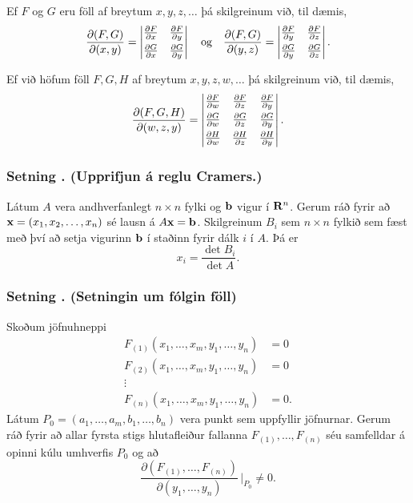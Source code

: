 Ef $F$ og $G$ eru föll af breytum $x,y,z,\ldots$ þá skilgreinum við,
til dæmis,
$$\frac{\partial(F,G)}{\partial(x,y)}=
\begin{vmatrix} 
\frac{\partial F}{\partial x}&\frac{\partial F}{\partial y}\\
\noalign{\smallskip}
\frac{\partial G}{\partial x}&\frac{\partial G}{\partial y}
\end{vmatrix}\quad \mbox{og}\quad
\frac{\partial(F,G)}{\partial(y,z)}=
\begin{vmatrix} 
\frac{\partial F}{\partial y}&\frac{\partial F}{\partial z}\\
\noalign{\smallskip}
\frac{\partial G}{\partial y}&\frac{\partial G}{\partial z}
\end{vmatrix}.$$

Ef við höfum föll $F, G, H$ af breytum $x,y,z,w,\ldots$ þá
skilgreinum við, til dæmis,
$$\frac{\partial(F,G,H)}{\partial(w,z,y)}=
\begin{vmatrix} 
\frac{\partial F}{\partial w}&\frac{\partial F}{\partial z}
&\frac{\partial F}{\partial y}\\
\noalign{\smallskip}
\frac{\partial G}{\partial w}&\frac{\partial G}{\partial z}
&\frac{\partial G}{\partial y}\\
\noalign{\smallskip}
\frac{\partial H}{\partial w}&\frac{\partial H}{\partial z}
&\frac{\partial H}{\partial y}
\end{vmatrix}.$$




\subsubsection{Setning \kaflanr.  (Upprifjun á reglu Cramers.)}

 Látum $A$ vera andhverfanlegt
$n\times n$ fylki og $\mbox{${\bf b}$}$ vigur í $\mbox{${\bf R}^n$}$.  Gerum ráð fyrir að
$\mbox{${\bf x}$}=(x_1, x_2, \ldots, x_n)$ sé lausn á $A\mbox{${\bf x}$}=\mbox{${\bf b}$}$.  Skilgreinum
$B_i$ sem $n\times n$ fylkið sem fæst með því að setja vigurinn $\mbox{${\bf b}$}$
í staðinn fyrir dálk $i$ í $A$.  Þá er
$$x_i=\frac{\det B_i}{\det A}.$$




\subsubsection{Setning \kaflanr. (Setningin um fólgin föll)}
Skoðum jöfnuhneppi
\begin{align*}
F_{(1)}(x_1,\ldots,x_m, y_1, \ldots, y_n)&=0\\
F_{(2)}(x_1,\ldots,x_m, y_1, \ldots, y_n)&=0\\
\vdots\\
F_{(n)}(x_1,\ldots,x_m, y_1, \ldots, y_n)&=0.
\end{align*}
Látum $P_0=(a_1,\ldots, a_m, b_1,\ldots, b_n)$ vera punkt sem uppfyllir
jöfnurnar.   
Gerum ráð fyrir að allar fyrsta stigs
hlutafleiður fallanna $F_{(1)},\ldots, F_{(n)}$ séu samfelldar á opinni kúlu umhverfis $P_0$ og að
$$\frac{\partial(F_{(1)}, \ldots, F_{(n)})}
{\partial( y_1, \ldots, y_n)}\,\bigg|_{P_0}\neq 0.$$



